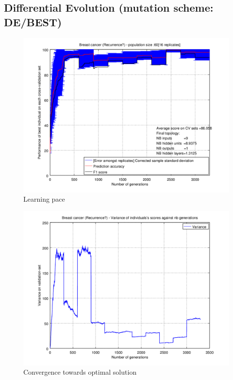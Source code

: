 \documentclass[a4paper,12pt, oneside]{memoir}
\begin{document}
\clearpage

\subsection{Differential Evolution (mutation scheme: DE/BEST)}

\begin{figure}[h]
  \centering
  \includegraphics[scale=0.7]{recurrence-performancesVSepochs-DE-BEST}
  \vspace{-12pt}
  \caption{Learning pace}
  \label{recurrence-perfs}
\end{figure}

\begin{figure}[h]
  \centering
  \includegraphics[scale=0.7]{recurrence-varianceVSepochs-DE-BEST}
  \vspace{-12pt}
  \caption{Convergence towards optimal solution}
  \label{recurrence-variance}
\end{figure}
\end{document}
